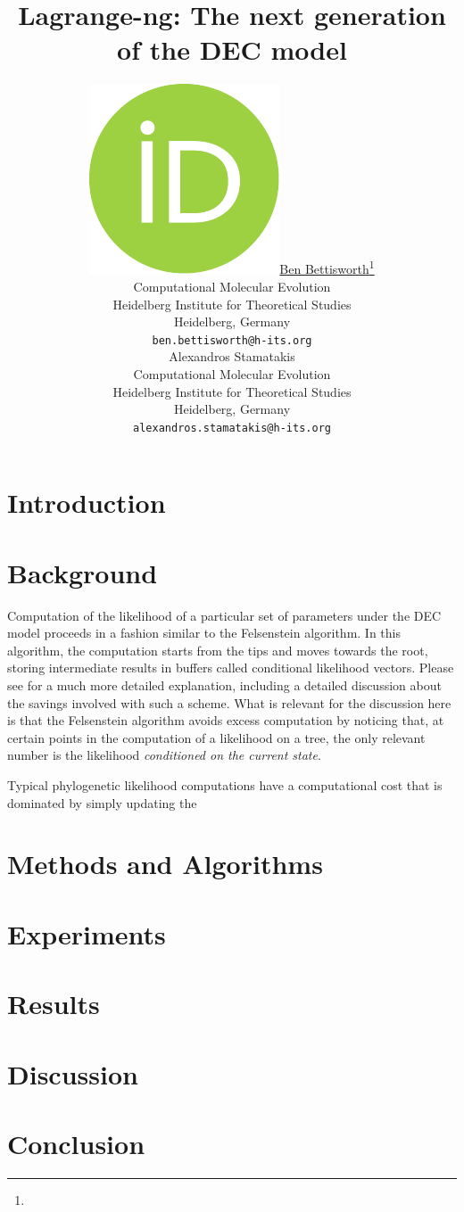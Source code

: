 \documentclass{article}
\title{Lagrange-ng: The next generation of the DEC model}
\author{\href{https://orcid.org/0000-0002-9130-6878}{\includegraphics[scale=0.06]{orcid.pdf}\hspace{1mm}Ben Bettisworth}\thanks{} \\
  Computational Molecular Evolution\\
  Heidelberg Institute for Theoretical Studies\\
  Heidelberg, Germany \\
  \texttt{ben.bettisworth@h-its.org} \\
  \And
  Alexandros Stamatakis\\
  Computational Molecular Evolution\\
  Heidelberg Institute for Theoretical Studies\\
  Heidelberg, Germany\\
  \texttt{alexandros.stamatakis@h-its.org} \\
}
\begin{document}
\maketitle

\begin{abstract}
\end{abstract}


\section{Introduction}

\section{Background}

Computation of the likelihood of a particular set of parameters under the DEC model proceeds in a fashion similar to the
Felsenstein algorithm. In this algorithm, the computation starts from the tips and moves towards the root, storing
intermediate results in buffers called conditional likelihood vectors. Please see \cite{yang2006computational} for a
much more detailed explanation, including a detailed discussion about the savings involved with such a scheme. What is
relevant for the discussion here is that the Felsenstein algorithm avoids excess computation by noticing that, at
certain points in the computation of a likelihood on a tree, the only relevant number is the likelihood
\textit{conditioned on the current state}.

Typical phylogenetic likelihood computations have a computational cost that is dominated by simply updating the

\section{Methods and Algorithms}
\label{sec:methods}

\section{Experiments}
\label{sec:experiments}

\section{Results}
\label{sec:results}

\section{Discussion}
\label{sec:discussion}

\section{Conclusion}
\label{sec:conclusion}



\end{document}
